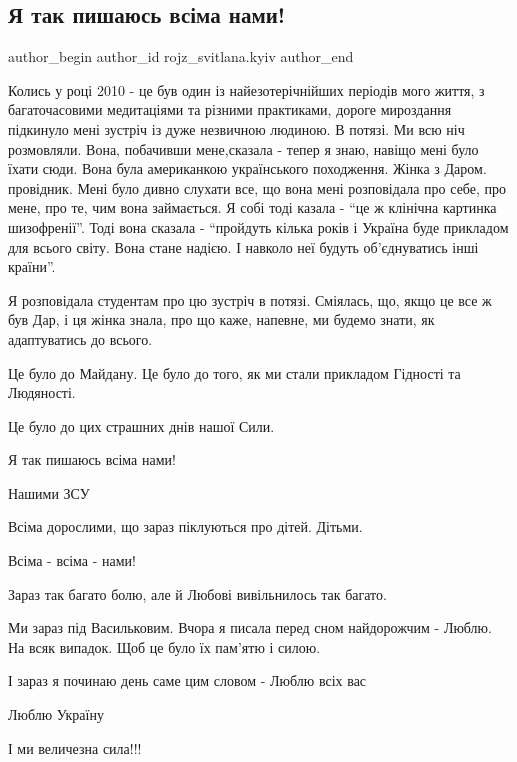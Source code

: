  
 
 
 
 
 
\subsection{Я так пишаюсь всіма нами!}
\label{sec:27_02_2022.fb.rojz_svitlana.kyiv.2.pyshajusja}
 
\ifcmt
 author_begin
   author_id rojz_svitlana.kyiv
 author_end
\fi


Колись у році 2010 - це був один із найезотерічнійших періодів мого життя, з
багаточасовими медитаціями та різними практиками, дороге мироздання підкинуло
мені зустріч із дуже незвичною людиною. В потязі. Ми всю ніч розмовляли. Вона,
побачивши мене,сказала - тепер я знаю, навіщо мені було їхати сюди. Вона була
американкою українського походження. Жінка з Даром. провідник. Мені було дивно
слухати все, що вона мені розповідала про себе, про мене, про те, чим вона
займається. Я собі тоді казала - \enquote{це ж клінічна картинка шизофренії}. Тоді вона
сказала - \enquote{пройдуть кілька років і Україна буде прикладом для всього світу.
Вона стане надією. І навколо неї будуть об'єднуватись інші країни}.

Я розповідала студентам про цю зустріч в потязі. Сміялась, що, якщо це все ж
був Дар, і ця жінка знала, про що каже, напевне, ми будемо знати, як
адаптуватись до всього.

Це було до Майдану. Це було до того, як ми стали прикладом Гідності та
Людяності.

Це було до цих страшних днів нашої Сили.

Я так пишаюсь всіма нами!

Нашими ЗСУ

Всіма дорослими, що зараз піклуються про дітей. Дітьми.

Всіма - всіма - нами!

Зараз так багато болю, але й Любові вивільнилось так багато.

Ми зараз під Васильковим. Вчора я писала перед сном найдорожчим - Люблю. На
всяк випадок. Щоб це було їх пам'ятю і силою.

І зараз я починаю день саме цим словом - Люблю всіх вас

Люблю Україну

І ми величезна сила!!!


